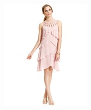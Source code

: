\documentclass[11pt]{article}
\begin{document}
\begin{figure}
\centering
\begin{subfigure}{.18\textwidth}
\centering
\includegraphics[width=\linewidth]{concepts/concept1_pos1.jpg}
\label{fig:sub1}
\end{subfigure}%
\begin{subfigure}{.18\textwidth}
\centering

\end{subfigure}
\end{figure}
\end{document}
